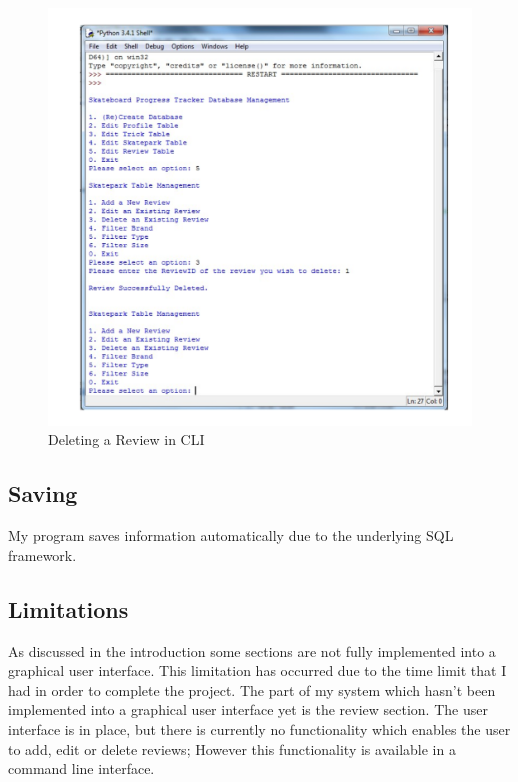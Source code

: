 \begin{figure}[H]
    \includegraphics[width=\textwidth]{./Manual/Images/DeleteReview.pdf}
    \caption{Deleting a Review in CLI} \label{fig:Delete Review}
\end{figure}


\subsection{Saving}

My program saves information automatically due to the underlying SQL framework.

\subsection{Limitations} 

As discussed in the introduction some sections are not fully implemented into a graphical user interface. This limitation has occurred due to the time limit that I had in order to complete the project. The part of my system which hasn't been implemented into a graphical user interface yet is the review section. The user interface is in place, but there is currently no functionality which enables the user to add, edit or delete reviews; However this functionality is available in a command line interface.

